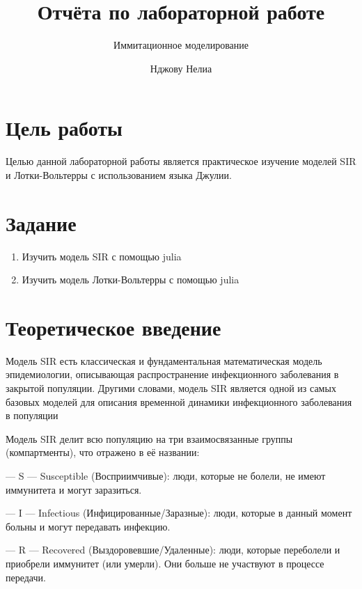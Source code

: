 \documentclass[
  12pt,
  a4paper,
  DIV=11,
  numbers=noendperiod]{scrreprt}
\title{Отчёта по лабораторной работе}
\subtitle{Иммитационное моделирование}
\author{Нджову Нелиа}
\date{}
\renewcommand*\contentsname{Содержание}
\newcommand\contentsname{Содержание}
\begin{document}
\maketitle

\renewcommand*\contentsname{Содержание}
{
\setcounter{tocdepth}{1}
\tableofcontents
}
\listoffigures
\listoftables
{}
\chapter{Цель
работы}\label{ux446ux435ux43bux44c-ux440ux430ux431ux43eux442ux44b}

Целью данной лабораторной работы является практическое изучение моделей
SIR и Лотки-Вольтерры с использованием языка Джулии.

\chapter{Задание}\label{ux437ux430ux434ux430ux43dux438ux435}

\begin{enumerate}
\def\labelenumi{\arabic{enumi}.}
\item
  Изучить модель SIR с помощью julia
\item
  Изучить модель Лотки-Вольтерры с помощью julia
\end{enumerate}

\chapter{Теоретическое
введение}\label{ux442ux435ux43eux440ux435ux442ux438ux447ux435ux441ux43aux43eux435-ux432ux432ux435ux434ux435ux43dux438ux435}

Модель SIR есть классическая и фундаментальная математическая модель
эпидемиологии, описывающая распространение инфекционного заболевания в
закрытой популяции. Другими словами, модель SIR является одной из самых
базовых моделей для описания временной динамики инфекционного
заболевания в популяции

Модель SIR делит всю популяцию на три взаимосвязанные группы
(компартменты), что отражено в её названии:

--- S --- Susceptible (Восприимчивые): люди, которые не болели, не имеют
иммунитета и могут заразиться.

--- I --- Infectious (Инфицированные/Заразные): люди, которые в данный
момент больны и могут передавать инфекцию.

--- R --- Recovered (Выздоровевшие/Удаленные): люди, которые переболели
и приобрели иммунитет (или умерли). Они больше не участвуют в процессе
передачи.
\end{document}
